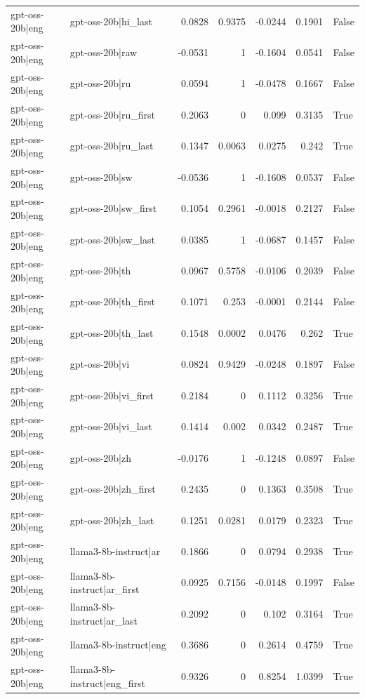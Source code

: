 \begin{table}
\begin{tabular}{l l r r r r l}
gpt-oss-20b|eng & gpt-oss-20b|hi_last & 0.0828 & 0.9375 & -0.0244 & 0.1901 & False \\
gpt-oss-20b|eng & gpt-oss-20b|raw & -0.0531 & 1 & -0.1604 & 0.0541 & False \\
gpt-oss-20b|eng & gpt-oss-20b|ru & 0.0594 & 1 & -0.0478 & 0.1667 & False \\
gpt-oss-20b|eng & gpt-oss-20b|ru_first & 0.2063 & 0 & 0.099 & 0.3135 & True \\
gpt-oss-20b|eng & gpt-oss-20b|ru_last & 0.1347 & 0.0063 & 0.0275 & 0.242 & True \\
gpt-oss-20b|eng & gpt-oss-20b|sw & -0.0536 & 1 & -0.1608 & 0.0537 & False \\
gpt-oss-20b|eng & gpt-oss-20b|sw_first & 0.1054 & 0.2961 & -0.0018 & 0.2127 & False \\
gpt-oss-20b|eng & gpt-oss-20b|sw_last & 0.0385 & 1 & -0.0687 & 0.1457 & False \\
gpt-oss-20b|eng & gpt-oss-20b|th & 0.0967 & 0.5758 & -0.0106 & 0.2039 & False \\
gpt-oss-20b|eng & gpt-oss-20b|th_first & 0.1071 & 0.253 & -0.0001 & 0.2144 & False \\
gpt-oss-20b|eng & gpt-oss-20b|th_last & 0.1548 & 0.0002 & 0.0476 & 0.262 & True \\
gpt-oss-20b|eng & gpt-oss-20b|vi & 0.0824 & 0.9429 & -0.0248 & 0.1897 & False \\
gpt-oss-20b|eng & gpt-oss-20b|vi_first & 0.2184 & 0 & 0.1112 & 0.3256 & True \\
gpt-oss-20b|eng & gpt-oss-20b|vi_last & 0.1414 & 0.002 & 0.0342 & 0.2487 & True \\
gpt-oss-20b|eng & gpt-oss-20b|zh & -0.0176 & 1 & -0.1248 & 0.0897 & False \\
gpt-oss-20b|eng & gpt-oss-20b|zh_first & 0.2435 & 0 & 0.1363 & 0.3508 & True \\
gpt-oss-20b|eng & gpt-oss-20b|zh_last & 0.1251 & 0.0281 & 0.0179 & 0.2323 & True \\
gpt-oss-20b|eng & llama3-8b-instruct|ar & 0.1866 & 0 & 0.0794 & 0.2938 & True \\
gpt-oss-20b|eng & llama3-8b-instruct|ar_first & 0.0925 & 0.7156 & -0.0148 & 0.1997 & False \\
gpt-oss-20b|eng & llama3-8b-instruct|ar_last & 0.2092 & 0 & 0.102 & 0.3164 & True \\
gpt-oss-20b|eng & llama3-8b-instruct|eng & 0.3686 & 0 & 0.2614 & 0.4759 & True \\
gpt-oss-20b|eng & llama3-8b-instruct|eng_first & 0.9326 & 0 & 0.8254 & 1.0399 & True \\

\end{tabular}
\end{table}
